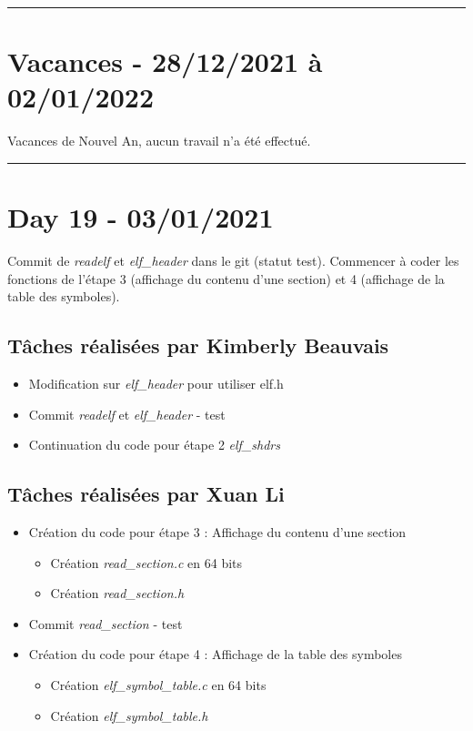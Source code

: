 \documentclass[11pt,letterpaper]{article}
\begin{document}
\noindent\rule{13cm}{0.4pt}

\section*{Vacances - 28/12/2021 à 02/01/2022}
Vacances de Nouvel An, aucun travail n'a été effectué.

\noindent\rule{13cm}{0.4pt}

\section*{Day 19 - 03/01/2021}
Commit de \textit{readelf} et \textit{elf\_header} dans le git (statut test). 
Commencer à coder les fonctions de l'étape 3 (affichage du contenu d'une 
section) et 4 (affichage de la table des symboles).

\subsection*{Tâches réalisées par Kimberly Beauvais}
\begin{itemize}
    \item Modification sur \textit{elf\_header} pour utiliser elf.h
    \item Commit \textit{readelf} et \textit{elf\_header} - test
    \item Continuation du code pour étape 2 \textit{elf\_shdrs}
\end{itemize}

\subsection*{Tâches réalisées par Xuan Li}
\begin{itemize}
    \item Création du code pour étape 3 : Affichage du contenu d'une section
    \begin{itemize}
        \item Création \textit{read\_section.c} en 64 bits
        \item Création \textit{read\_section.h}
    \end{itemize}
    \item Commit \textit{read\_section} - test
    \item Création du code pour étape 4 : Affichage de la table des symboles
    \begin{itemize}
        \item Création \textit{elf\_symbol\_table.c} en 64 bits
        \item Création \textit{elf\_symbol\_table.h}
    \end{itemize}
\end{itemize}
\end{document}
